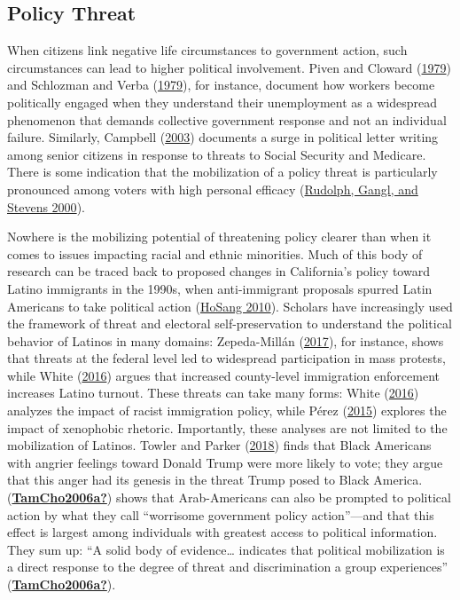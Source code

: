 \documentclass[
  12pt,
]{article}
\begin{document}
\hypertarget{policy-threat}{%
\subsection*{Policy Threat}\label{policy-threat}}

When citizens link negative life circumstances to government action, such circumstances can lead to higher political involvement. Piven and Cloward (\protect\hyperlink{ref-Piven1979}{1979}) and Schlozman and Verba (\protect\hyperlink{ref-Schlozman1979}{1979}), for instance, document how workers become politically engaged when they understand their unemployment as a widespread phenomenon that demands collective government response and not an individual failure. Similarly, Campbell (\protect\hyperlink{ref-Campbell2003a}{2003}) documents a surge in political letter writing among senior citizens in response to threats to Social Security and Medicare. There is some indication that the mobilization of a policy threat is particularly pronounced among voters with high personal efficacy (\protect\hyperlink{ref-Rudolph2000}{Rudolph, Gangl, and Stevens 2000}).

Nowhere is the mobilizing potential of threatening policy clearer than when it comes to issues impacting racial and ethnic minorities. Much of this body of research can be traced back to proposed changes in California's policy toward Latino immigrants in the 1990s, when anti-immigrant proposals spurred Latin Americans to take political action (\protect\hyperlink{ref-HoSang2010}{HoSang 2010}). Scholars have increasingly used the framework of threat and electoral self-preservation to understand the political behavior of Latinos in many domains: Zepeda-Millán (\protect\hyperlink{ref-Zepeda-Millan2017}{2017}), for instance, shows that threats at the federal level led to widespread participation in mass protests, while White (\protect\hyperlink{ref-White2016}{2016}) argues that increased county-level immigration enforcement increases Latino turnout. These threats can take many forms: White (\protect\hyperlink{ref-White2016}{2016}) analyzes the impact of racist immigration policy, while Pérez (\protect\hyperlink{ref-Perez2015}{2015}) explores the impact of xenophobic rhetoric. Importantly, these analyses are not limited to the mobilization of Latinos. Towler and Parker (\protect\hyperlink{ref-Towler2018}{2018}) finds that Black Americans with angrier feelings toward Donald Trump were more likely to vote; they argue that this anger had its genesis in the threat Trump posed to Black America. (\protect\hyperlink{ref-TamCho2006a}{\textbf{TamCho2006a?}}) shows that Arab-Americans can also be prompted to political action by what they call ``worrisome government policy action''---and that this effect is largest among individuals with greatest access to political information. They sum up: ``A solid body of evidence\ldots{} indicates that political mobilization is a direct response to the degree of threat and discrimination a group experiences'' (\protect\hyperlink{ref-TamCho2006a}{\textbf{TamCho2006a?}}).
\end{document}
